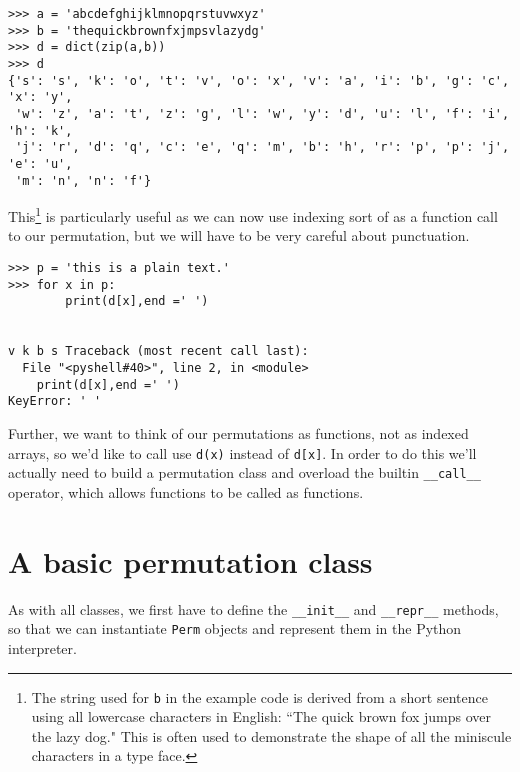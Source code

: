 \documentclass[m3380-lec-main.tex]{subfiles}
\begin{document}
\bc\begin{verbatim}
>>> a = 'abcdefghijklmnopqrstuvwxyz'
>>> b = 'thequickbrownfxjmpsvlazydg'
>>> d = dict(zip(a,b))
>>> d
{'s': 's', 'k': 'o', 't': 'v', 'o': 'x', 'v': 'a', 'i': 'b', 'g': 'c', 'x': 'y', 
 'w': 'z', 'a': 't', 'z': 'g', 'l': 'w', 'y': 'd', 'u': 'l', 'f': 'i', 'h': 'k', 
 'j': 'r', 'd': 'q', 'c': 'e', 'q': 'm', 'b': 'h', 'r': 'p', 'p': 'j', 'e': 'u', 
 'm': 'n', 'n': 'f'}
\end{verbatim}
\ec
This\footnote{The string used for \texttt{b} in the example code is derived from a short sentence using all lowercase characters in English: ``The quick brown fox jumps over the lazy dog." This is often used to demonstrate the shape of all the miniscule characters in a type face.} is particularly useful as we can now use indexing sort of as a function call to our permutation, but we will have to be very careful about punctuation.

\bc\begin{verbatim}
>>> p = 'this is a plain text.'
>>> for x in p:
        print(d[x],end =' ')

	
v k b s Traceback (most recent call last):
  File "<pyshell#40>", line 2, in <module>
    print(d[x],end =' ')
KeyError: ' '
\end{verbatim}
\ec
Further, we want to think of our permutations as functions, not as indexed arrays, so we'd like to call use \verb|d(x)| instead of \verb|d[x]|. In order to do this we'll actually need to build a permutation class and overload the builtin \verb|__call__| operator, which allows functions to be called as functions.

\section{A basic permutation class}
As with all classes, we first have to define the \verb|__init__| and \verb|__repr__| methods, so that we can instantiate \verb|Perm| objects and represent them in the Python interpreter.
\end{document}
